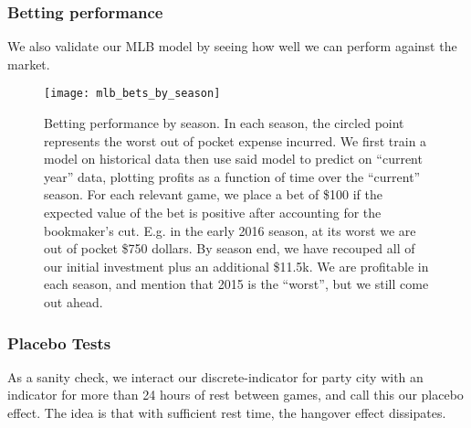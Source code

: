 \documentclass[letterpaper,12pt]{article}
\begin{document}
\subsubsection{Betting performance}
We also validate our MLB model by seeing how well we can perform against the
market.
\begin{figure}[!h]
  \centering
  \label{mlb bets by season}
  \texttt{[image: mlb\_bets\_by\_season]}
  \caption{Betting performance by season. In each season, the 
    circled point represents the worst out of pocket expense incurred.
    We first train a model on historical data then use said model to predict on ``current year''
    data, plotting profits as a function of time over the ``current'' season. For each relevant
    game, we place a bet of \$100 if the expected value of the bet is positive after accounting for the bookmaker's cut. E.g. in the     early 2016 season,
    at its worst we are out of pocket \$750 dollars. By season end, we have     recouped all of
    our initial investment plus an additional \$11.5k. We are profitable in each season, and mention that 2015 is the ``worst'', but we still come out ahead.}
  \label{bettingperf}
\end{figure}

\subsubsection{Placebo Tests} As a sanity check, we interact our
discrete-indicator for party city with an indicator for more than 24 hours of rest
between games, and call this our placebo effect. 
The idea is that with sufficient rest time, the hangover effect dissipates.
\end{document}
